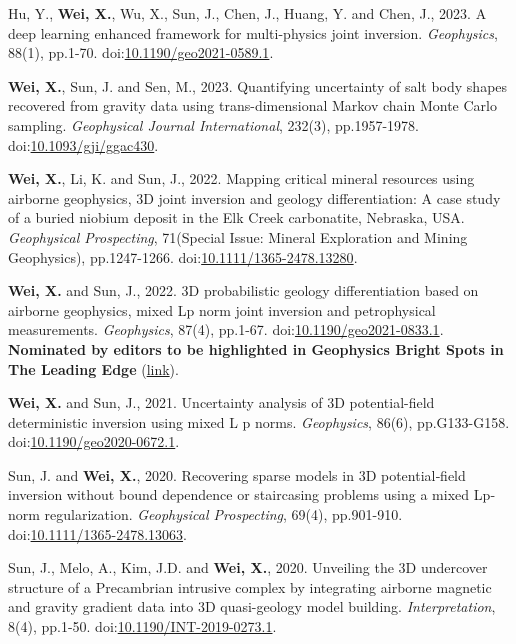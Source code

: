 \documentclass[11pt, a4paper]{article}
\newcommand{\LastName}{Wei}
\newcommand{\Initials}{X}
\newcommand{\Wei}{\textbf{\LastName, \Initials.}}  %
\newcommand{\WeiSun}{\textbf{\LastName, \Initials.} and Sun, J.}  %
\newcommand{\DOI}[1]{doi:\href{https://doi.org/#1}{#1}}
\begin{document}
\begin{etaremune}
	\item
	Hu, Y., \Wei, Wu, X., Sun, J., Chen, J., Huang, Y. and Chen, J., 2023. A deep learning enhanced framework for multi-physics joint inversion. \emph{Geophysics}, 88(1), pp.1-70. \DOI{10.1190/geo2021-0589.1}.
	
	\item
	\Wei, Sun, J. and Sen, M., 2023. Quantifying uncertainty of salt body shapes recovered from gravity data using trans-dimensional Markov chain Monte Carlo sampling. \emph{Geophysical Journal International}, 232(3), pp.1957-1978. \DOI{10.1093/gji/ggac430}.

	\item
	\Wei, Li, K. and Sun, J., 2022. Mapping critical mineral resources using airborne geophysics, 3D joint inversion and geology differentiation: A case study of a buried niobium deposit in the Elk Creek carbonatite, Nebraska, USA. \emph{Geophysical Prospecting}, 71(Special Issue: Mineral Exploration and Mining Geophysics), pp.1247-1266. \DOI{10.1111/1365-2478.13280}.

	\item
	\WeiSun, 2022. 3D probabilistic geology differentiation based on airborne geophysics, mixed Lp norm joint inversion and petrophysical measurements. \emph{Geophysics}, 87(4), pp.1-67.
	\DOI{10.1190/geo2021-0833.1}. \textbf{Nominated by editors to be highlighted in Geophysics Bright Spots in The Leading Edge }(\href{https://library.seg.org/doi/epub/10.1190/tle41100730.1}{link}).
	
	\item
	\WeiSun, 2021. Uncertainty analysis of 3D potential-field deterministic inversion using mixed L p norms. \emph{Geophysics}, 86(6), pp.G133-G158.
	\DOI{10.1190/geo2020-0672.1}.

	\item
	Sun, J. and \Wei, 2020. Recovering sparse models in 3D potential‐field inversion without bound dependence or staircasing problems using a mixed Lp‐norm regularization. \emph{Geophysical Prospecting}, 69(4), pp.901-910.
	\DOI{10.1111/1365-2478.13063}.

	\item
	Sun, J., Melo, A., Kim, J.D. and \Wei, 2020. Unveiling the 3D undercover structure of a Precambrian intrusive complex by integrating airborne magnetic and gravity gradient data into 3D quasi-geology model building. \emph{Interpretation}, 8(4), pp.1-50.
	\DOI{10.1190/INT-2019-0273.1}.

\end{etaremune}
\end{document}
